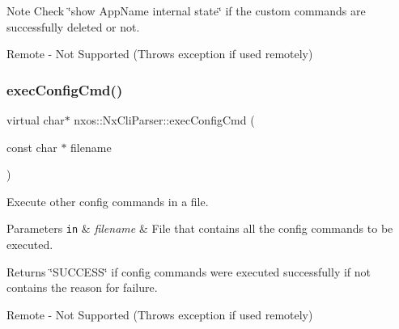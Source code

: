 \begin{DoxyNote}{Note}
Check \char`\"{}show App\+Name internal state\char`\"{} if the custom commands are successfully deleted or not.
\end{DoxyNote}
\begin{DoxyVerb}Remote - Not Supported (Throws exception if used remotely)\end{DoxyVerb}
 \mbox{\label{classnxos_1_1_nx_cli_parser_aa22ee0395ceadc46a3e28b93c5a5b75e}} 
\subsubsection{\texorpdfstring{exec\+Config\+Cmd()}{execConfigCmd()}\hspace{0.1cm}{\footnotesize\ttfamily [1/2]}}
{\footnotesize\ttfamily virtual char$\ast$ nxos\+::\+Nx\+Cli\+Parser\+::exec\+Config\+Cmd (\begin{DoxyParamCaption}\item[{const char $\ast$}]{filename }\end{DoxyParamCaption})\hspace{0.3cm}{\ttfamily [pure virtual]}}

Execute other config commands in a file.


\begin{DoxyParams}[1]{Parameters}
\mbox{\tt in}  & {\em filename} & File that contains all the config commands to be executed.\\
\hline
\end{DoxyParams}
\begin{DoxyReturn}{Returns}
\char`\"{}\+S\+U\+C\+C\+E\+S\+S\char`\"{} if config commands were executed successfully if not contains the reason for failure.
\end{DoxyReturn}
\begin{DoxyVerb}Remote - Not Supported (Throws exception if used remotely)
\end{DoxyVerb}



